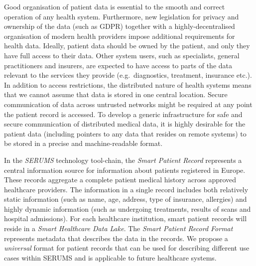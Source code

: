 
\noindent
Good organisation of patient data is essential to the smooth and correct operation of any health system. 
Furthermore, new legislation for privacy and ownership of the data (such as GDPR) together with a highly-decentralised organisation of modern health providers impose additional requirements for health data. Ideally, patient data should be owned by the patient, and only they have full access to their data. Other system users, such as specialists, general practitioners and insurers, are expected to have access to parts of the data relevant to the services they provide (e.g.~diagnostics, treatment, insurance etc.). In addition to access restrictions, the distributed nature of health systems means that we cannot assume that data is stored in one central location. Secure communication of data across untrusted networks might be required at any point the patient record is accessed. To develop a generic infrastructure for safe and secure communication of distributed medical data, it is highly desirable for the patient data (including pointers to any data that resides on remote systems) to be stored in a precise and machine-readable format.

In the \emph{SERUMS} technology tool-chain, the \emph{Smart Patient Record} represents a central information source for information about patients registered in Europe. These records aggregate a complete patient medical history across approved healthcare providers. The information in a single record includes both relatively static information (such as name, age, address, type of insurance, allergies) and highly dynamic information (such as undergoing treatments, results of scans and hospital admissions). For each healthcare institution, smart patient records will reside in a \emph{Smart Healthcare Data Lake}. The \emph{Smart Patient Record Format} represents metadata that describes the data in the records. 
We propose a \emph{universal} format for patient records that can be used for describing different use cases within SERUMS and is applicable to future healthcare systems.

